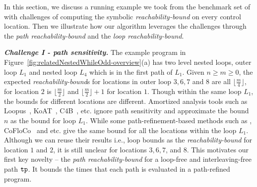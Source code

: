 In this section, we discuss a running example we took from
the benchmark set of~\cite{GulwaniZ10} with
challenges of computing the symbolic
\emph{reachability-bound} on
every control location. Then we illustrate how our algorithm leverages the challenges through the \emph{path reachability-bound} and the \emph{loop reachability-bound}.



\textbf{\emph{Challenge I - path sensitivity.}}
The example program in Figure~\ref{fig:relatedNestedWhileOdd-overview}(a) has two level nested loops, outer loop $L_1$ and nested loop $L_4$ which is in the first path of $L_1$. Given $n \geq m \geq 0$,
the expected \emph{reachability-bound}s for locations in outer loop $3, 6, 7$ and $8$ are all $\lfloor\frac{m}{4}\rfloor$,
for location $2$ is $\lfloor\frac{m}{2}\rfloor$ and $\lfloor\frac{m}{2}\rfloor + 1$ for location $1$.
{Though within the same loop $L_1$, the bounds for different locations are different.}
Amortized analysis tools such as Loopus~\cite{SinnZV17}, KoAT~\cite{BrockschmidtEFFG14,FalkeKS12,FalkeKS11}, C4B~\cite{CarbonneauxHS15}, etc. ignore path sensitivity and approximate the bound $n$ as the bound for loop $L_1$. 
While some path-refinement-based methods such as \cite{GulwaniZ10,GulwaniJK09}, CoFloCo~\cite{Montoya17,Flores-Montoya16,Flores-MontoyaH14} and etc. give the same bound for all the locations within the loop $L_1$. 
Although we can reuse their results i.e., loop bounds as the \emph{reachability-bound} for location $1$ and $2$,
it is still unclear for locations $3, 6, 7$, and $8$.
%
This motivates our first key novelty -- the \emph{path reachability-bound}
for a loop-free and interleaving-free path $\mathtt{tp}$.
It bounds the times that each path is evaluated in a path-refined program.

